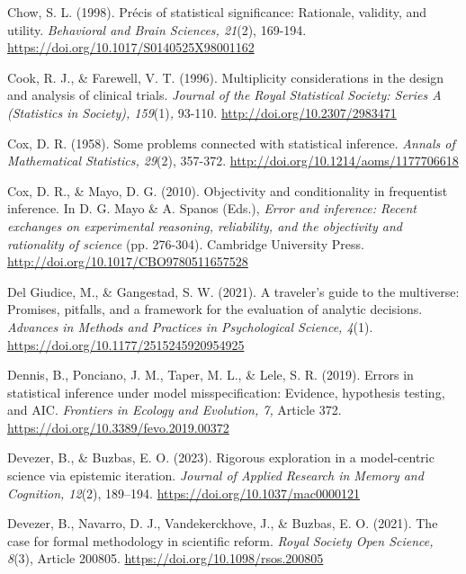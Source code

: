 \documentclass[authordate, meta]{jote-new-article}
\begin{document}
	Chow, S. L. (1998). Précis of statistical significance: Rationale, validity, and utility. \emph{Behavioral and Brain Sciences, 21}(2), 169-194. \url{https://doi.org/10.1017/S0140525X98001162}



	Cook, R. J., \& Farewell, V. T. (1996). Multiplicity considerations in the design and analysis of clinical trials.\emph{ Journal of the Royal Statistical Society: Series A (Statistics in Society), 159}(1)\emph{, }93-110. \url{http://doi.org/10.2307/2983471}



	Cox, D. R. (1958). Some problems connected with statistical inference. \emph{Annals of Mathematical Statistics, 29}(2), 357-372. \url{http://doi.org/10.1214/aoms/1177706618}



	Cox, D. R., \& Mayo, D. G. (2010). Objectivity and conditionality in frequentist inference. In D. G. Mayo \& A. Spanos (Eds.), \emph{Error and inference: Recent exchanges on experimental reasoning, reliability, and the objectivity and rationality of science} (pp. 276-304). Cambridge University Press. \url{http://doi.org/10.1017/CBO9780511657528}



	Del Giudice, M., \& Gangestad, S. W. (2021). A traveler's guide to the multiverse: Promises, pitfalls, and a framework for the evaluation of analytic decisions. \emph{Advances in Methods and Practices in Psychological Science, 4}(1). \url{https://doi.org/10.1177/2515245920954925}



	Dennis, B., Ponciano, J. M., Taper, M. L., \& Lele, S. R. (2019). Errors in statistical inference under model misspecification: Evidence, hypothesis testing, and AIC. \emph{Frontiers in Ecology and Evolution, 7,} Article 372. \url{https://doi.org/10.3389/fevo.2019.00372}



	Devezer, B., \& Buzbas, E. O. (2023). Rigorous exploration in a model-centric science via epistemic iteration. \emph{Journal of Applied Research in Memory and Cognition, 12}(2), 189--194. \url{https://doi.org/10.1037/mac0000121}



	Devezer, B., Navarro, D. J., Vandekerckhove, J., \& Buzbas, E. O. (2021). The case for formal methodology in scientific reform. \emph{Royal Society Open Science, 8}(3), Article 200805. \url{https://doi.org/10.1098/rsos.200805}
\end{document}
